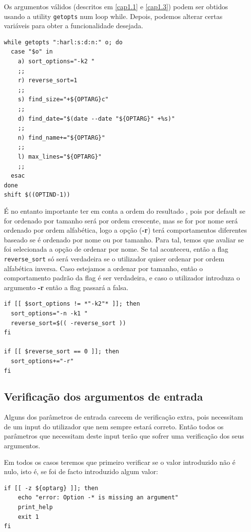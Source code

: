    Os argumentos válidos (descritos em \ref{cap1.1} e
   \ref{cap1.3}) podem ser obtidos usando a utility
   \verb|getopts| num loop while. Depois, podemos alterar
   certas variáveis para obter a funcionalidade desejada.

\begin{listing}[H]
\begin{verbatim}
while getopts ":harl:s:d:n:" o; do 
  case "$o" in
    a) sort_options="-k2 "
    ;;
    r) reverse_sort=1
    ;;
    s) find_size="+${OPTARG}c"
    ;;
    d) find_date="$(date --date "${OPTARG}" +%s)"
    ;;
    n) find_name+="${OPTARG}"
    ;;
    l) max_lines="${OPTARG}"
    ;;
  esac
done
shift $((OPTIND-1))
\end{verbatim}
\end{listing}

É no entanto importante ter em conta a ordem do resultado
, pois por default se for ordenado por tamanho
será por ordem crescente, mas se for por nome será ordenado
por ordem alfabética, logo a opção (\textbf{-r}) terá
comportamentos diferentes baseado se é ordenado por nome ou
por tamanho.
Para tal, temos que avaliar se foi selecionada a opção de
ordenar por nome. Se tal aconteceu, então a flag
\verb|reverse_sort| só será verdadeira se o utilizador quiser
ordenar por ordem alfabética inversa. Caso estejamos a
ordenar por tamanho, então o comportamento padrão da flag é
ser verdadeira, e caso o utilizador introduza o argumento
\textbf{-r} então a flag passará a falsa.
\begin{listing}[H]
\begin{verbatim}
if [[ $sort_options != *"-k2"* ]]; then
  sort_options="-n -k1 "
  reverse_sort=$(( -reverse_sort ))
fi

if [[ $reverse_sort == 0 ]]; then
  sort_options+="-r"
fi
\end{verbatim}
\end{listing}

\subsection{Verificação dos argumentos de entrada}

Alguns dos parâmetros de entrada carecem de verificação extra,
pois necessitam de um input do utilizador que nem sempre estará
correto. Então todos os parâmetros que necessitam deste input
terão que sofrer uma verificação dos seus argumentos.


Em todos os casos teremos que primeiro verificar se o valor
introduzido não é nulo, isto é, se foi de facto introduzido
algum valor:
\begin{verbatim}
if [[ -z ${optarg} ]]; then
    echo "error: Option -* is missing an argument"
    print_help
    exit 1
fi
\end{verbatim}

